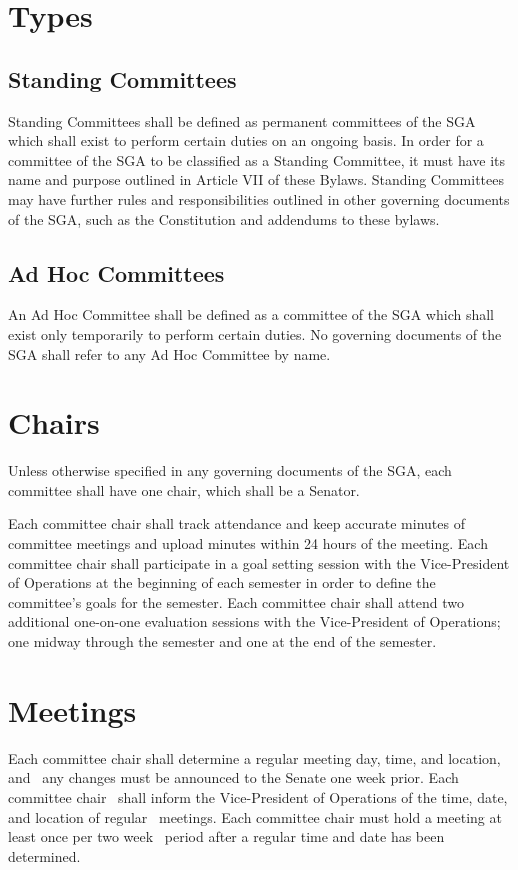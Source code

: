 \documentclass[12pt]{scrreprt}
\begin{document}
\section{Types}

\subsection{Standing Committees}
Standing Committees shall be defined as permanent committees of the SGA which shall exist to perform certain duties on an ongoing basis. In order for a committee of the SGA to be classified as a Standing Committee, it must have its name and purpose outlined in Article VII of these Bylaws. Standing Committees may have further rules and responsibilities outlined in other governing documents of the SGA, such as the Constitution and addendums to these bylaws.

\subsection{Ad Hoc Committees}
An Ad Hoc Committee shall be defined as a committee of the SGA which shall exist only temporarily to perform certain duties. No governing documents of the SGA shall refer to any Ad Hoc Committee by name.


\section{Chairs}
Unless otherwise specified in any governing documents of the SGA, each committee shall have one chair, which shall be a Senator.


Each committee chair shall track attendance and keep accurate minutes of committee
meetings and upload minutes within 24 hours of the meeting. Each committee chair shall
participate in a goal setting session with the Vice-President of Operations at the beginning of
each semester in order to define the committee’s goals for the semester. Each committee chair
shall attend two additional one-on-one evaluation sessions with the Vice-President of
Operations; one midway through the semester and one at the end of the semester.

\section{Meetings}
Each committee chair shall determine a regular meeting day, time, and location, and  any changes must be announced to the Senate one week prior. Each committee chair  shall inform the Vice-President of Operations of the time, date, and location of regular  meetings. Each committee chair must hold a meeting at least once per two week  period after a regular time and date has been determined. 
\end{document}
